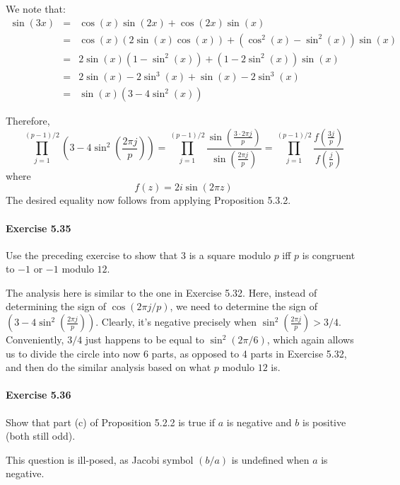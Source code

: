 \documentclass[notitlepage]{article}
\theoremstyle{definition}
\begin{document}
We note that:
\begin{eqnarray}
  \sin(3x) &=& \cos(x)\sin(2x) + \cos(2x)\sin(x) \\
  &=& \cos(x) (2 \sin(x) \cos(x)) + (\cos^2(x) - \sin^2(x)) \sin(x) \\
  &=& 2 \sin(x)(1 - \sin^2(x)) + (1 - 2 \sin^2(x)) \sin(x) \\
  &=& 2 \sin(x) - 2 \sin^3(x) + \sin(x) - 2\sin^3(x) \\
  &=& \sin(x) (3 - 4 \sin^2(x))
\end{eqnarray}

Therefore,
\begin{equation}
  \prod_{j=1}^{(p-1)/2} \left(3-4 \sin^2\left(\frac{2 \pi
    j}{p}\right)\right) = \prod_{j=1}^{(p-1)/2} \frac{\sin
    \left(\frac{3\cdot2 \pi j}{p}\right)} {\sin\left(\frac{2 \pi
      j}{p}\right)} = \prod_{j=1}^{(p-1)/2} \frac{f
    \left(\frac{3j}{p}\right)} {f\left(\frac{j}{p}\right)}
\end{equation}
where
\begin{equation}
  f(z) = 2 i \sin(2 \pi z)
\end{equation}
The desired equality now follows from applying Proposition 5.3.2.

\paragraph{Exercise 5.35}
Use the preceding exercise to show that $3$ is a square modulo $p$ iff
$p$ is congruent to $-1$ or $-1$ modulo $12$.

The analysis here is similar to the one in Exercise 5.32. Here,
instead of determining the sign of $\cos(2 \pi j/p)$, we need to
determine the sign of $\left(3-4 \sin^2\left(\frac{2 \pi
  j}{p}\right)\right)$. Clearly, it's negative precisely when $
\sin^2\left(\frac{2 \pi j}{p}\right) > 3/4$. Conveniently, $3/4$ just
happens to be equal to $\sin^2(2 \pi/6)$, which again allows us to
divide the circle into now 6 parts, as opposed to 4 parts in Exercise
5.32, and then do the similar analysis based on what $p$ modulo $12$
is.

\paragraph{Exercise 5.36}
Show that part (c) of Proposition 5.2.2 is true if $a$ is negative and
$b$ is positive (both still odd).

This question is ill-posed, as Jacobi symbol $(b/a)$ is undefined when
$a$ is negative.
\end{document}
